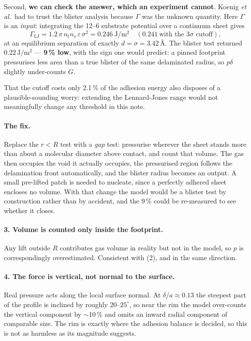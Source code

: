 \documentclass[11pt,a4paper]{article}
\begin{document}
Second, \textbf{we can check the answer, which an experiment cannot}. Koenig
\textit{et al.}\ had to trust the blister analysis because $\Gamma$ was the
unknown quantity. Here $\Gamma$ is an \emph{input}: integrating the 12--6
substrate potential over a continuum sheet gives
\begin{equation}
\Gamma_\mathrm{LJ} = 1.2\,\pi\, n_t n_s\, \varepsilon\, \sigma^2
 = 0.246\ \mathrm{J/m^2} \quad (0.241 \ \text{with the } 3\sigma \text{ cutoff}),
\end{equation}
at an equilibrium separation of exactly $d = \sigma = 3.42$\,\AA. The blister
test returned $0.22\,\mathrm{J/m^2}$ --- \textbf{9\,\% low}, with the sign one
would predict: a pinned footprint pressurises less area than a true blister of
the same delaminated radius, so $p\delta$ slightly under-counts $G$.

That the cutoff costs only 2.1\,\% of the adhesion energy also disposes of a
plausible-sounding worry: extending the Lennard-Jones range would not
meaningfully change any threshold in this note.

\paragraph{The fix.} Replace the $r<R$ test with a \emph{gap} test: pressurise
wherever the sheet stands more than about a molecular diameter above contact, and
count that volume. The gas then occupies the void it actually occupies, the
pressurised region follows the delamination front automatically, and the blister
radius becomes an output. A small pre-lifted patch is needed to nucleate, since a
perfectly adhered sheet encloses no volume. With that change the model would be a
blister test by construction rather than by accident, and the 9\,\% could be
re-measured to see whether it closes.

\paragraph{3. Volume is counted only inside the footprint.} Any lift outside $R$
contributes gas volume in reality but not in the model, so $p$ is
correspondingly overestimated. Consistent with (2), and in the same direction.

\paragraph{4. The force is vertical, not normal to the surface.} Real pressure
acts along the local surface normal. At $\delta/a \approx 0.13$ the steepest
part of the profile is inclined by roughly $20$--$25^\circ$, so near the rim the
model over-counts the vertical component by $\sim$10\,\% and omits an inward
radial component of comparable size. The rim is exactly where the adhesion
balance is decided, so this is not as harmless as its magnitude suggests.
\end{document}
